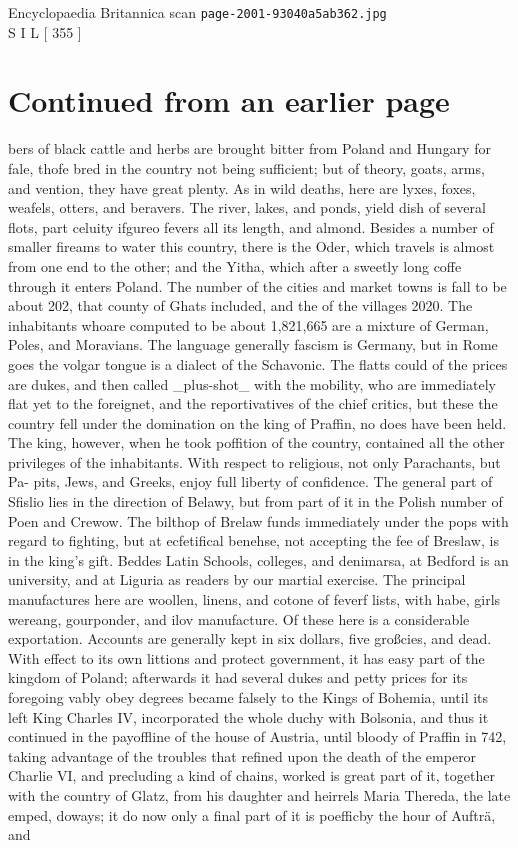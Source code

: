 \documentclass{article}
\begin{document}
\begin{center}
{\Large Encyclopaedia Britannica scan \texttt{page-2001-93040a5ab362.jpg}}\\[0.5em]
S I L [ 355 ]
\end{center}
\section*{Continued from an earlier page}
bers of black cattle and herbs are brought bitter from Poland and Hungary for fale, thofe bred in the country not being sufficient; but of theory, goats, arms, and vention, they have great plenty. As in wild deaths, here are lyxes, foxes, weafels, otters, and beravers. The river, lakes, and ponds, yield dish of several flots, part celuity ifgureo fevers all its length, and almond. Besides a number of smaller fireams to water this country, there is the Oder, which travels is almost from one end to the other; and the Yitha, which after a sweetly long coffe through it enters Poland. The number of the cities and market towns is fall to be about 202, that county of Ghats included, and the of the villages 2020. The inhabitants whoare computed to be about 1,821,665 are a mixture of German, Poles, and Moravians. The language generally fascism is Germany, but in Rome goes the volgar tongue is a dialect of the Schavonic. The flatts could of the prices are dukes, and then called \_plus-shot\_ with the mobility, who are immediately flat yet to the foreignet, and the reportivatives of the chief critics, but these the country fell under the domination on the king of Praffin, no does have been held. The king, however, when he took poffition of the country, contained all the other privileges of the inhabitants. With respect to religious, not only Parachants, but Pa- pits, Jews, and Greeks, enjoy full liberty of confidence. The general part of Sfislio lies in the direction of Belawy, but from part of it in the Polish number of Poen and Crewow. The bilthop of Brelaw funds immediately under the pops with regard to fighting, but at ecfetifical benehse, not accepting the fee of Breslaw, is in the king’s gift. Beddes Latin Schools, colleges, and denimarsa, at Bedford is an university, and at Liguria as readers by our martial exercise. The principal manufactures here are woollen, linens, and cotone of feverf lists, with habe, girls wereang, gourponder, and ilov manufacture. Of these here is a considerable exportation. Accounts are generally kept in six dollars, five großcies, and dead. With effect to its own littions and protect government, it has easy part of the kingdom of Poland; afterwards it had several dukes and petty prices for its foregoing vably obey degrees became falsely to the Kings of Bohemia, until its left King Charles IV, incorporated the whole duchy with Bolsonia, and thus it continued in the payoffline of the house of Austria, until bloody of Praffin in 742, taking advantage of the troubles that refined upon the death of the emperor Charlie VI, and precluding a kind of chains, worked is great part of it, together with the country of Glatz, from his daughter and heirrels Maria Thereda, the late emped, doways; it do now only a final part of it is poefficby the hour of Aufträ, and 
\end{document}
